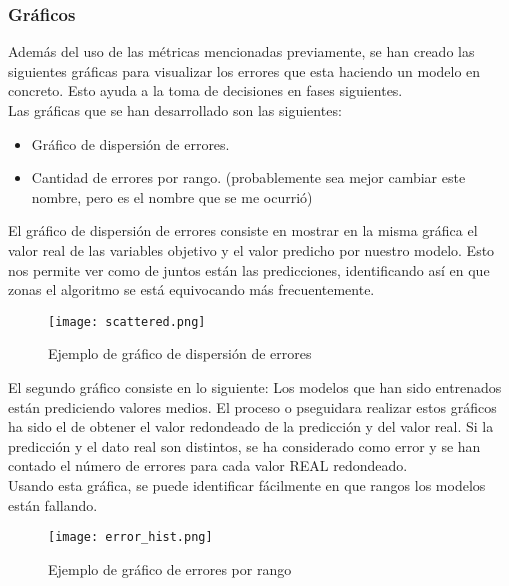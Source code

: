 \subsubsection{Gráficos}
Además del uso de las métricas mencionadas previamente, se han creado las siguientes gráficas para visualizar los errores que esta haciendo un modelo en concreto. Esto ayuda a la toma de decisiones en fases siguientes.\\
Las gráficas que se han desarrollado son las siguientes:
\begin{itemize}
	\item Gráfico de dispersión de errores.
	\item Cantidad de errores por rango. (probablemente sea mejor cambiar este nombre, pero es el nombre que se me ocurrió)
\end{itemize}
El gráfico de dispersión de errores consiste en mostrar en la misma gráfica el valor real de las variables objetivo y el valor predicho por nuestro modelo. Esto nos permite ver como de juntos están las predicciones, identificando así en que zonas el algoritmo se está equivocando más frecuentemente.\\
 \begin{figure}[H]
	\centering
	\texttt{[image: scattered.png]}
	\caption{Ejemplo de gráfico de dispersión de errores}
	\label{fig:scattered_example}
\end{figure}
El segundo gráfico consiste en lo siguiente:
Los modelos que han sido entrenados están prediciendo valores medios. El proceso o pseguidara realizar estos gráficos ha sido el de obtener el valor redondeado de la predicción y del valor real. Si la predicción y el dato real son distintos, se ha considerado como error y se han contado el número de errores para cada valor REAL redondeado.\\
Usando esta gráfica, se puede identificar fácilmente en que rangos los modelos están fallando.\\
\linebreak
 \begin{figure}[H]
	\centering
	\texttt{[image: error\_hist.png]}
	\caption{Ejemplo de gráfico de errores por rango}
	\label{fig:error_hist_example}
\end{figure}
